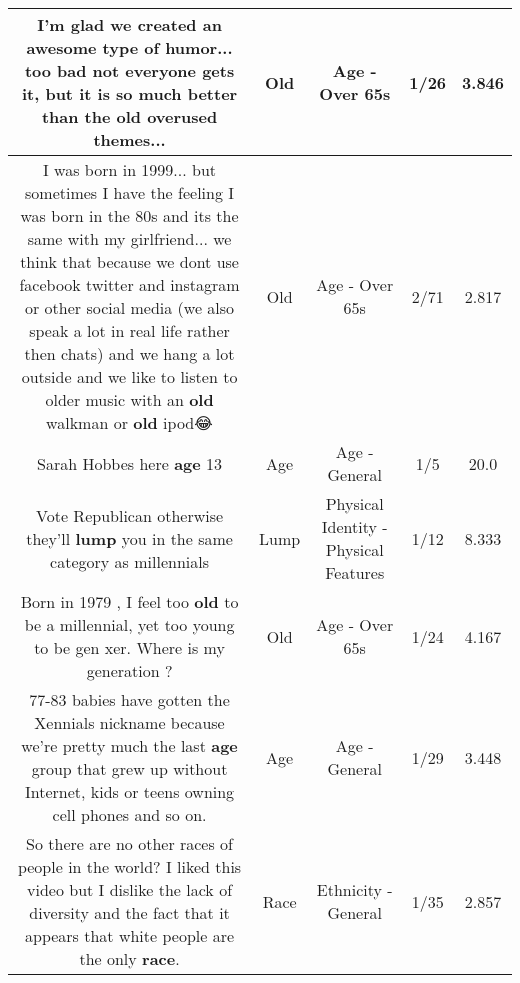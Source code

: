 \documentclass[11pt]{article}
\newlength\mylength
\begin{document}
\begin{center}
\begin{longtable}{|C{.65\mylength}|C{.30\mylength}|C{.12\mylength}|C{.12\mylength}|C{.12\mylength}|}
  \small I'm glad we created an awesome type of humor... too bad not everyone gets it, but it is so much better than the \textbf{old} overused themes...\normalsize   & Old & Age - Over 65s & 1/26 & 3.846 \\  \hline
  \small I was born in 1999... but sometimes I have the feeling I was born in the 80s and its the same with my girlfriend... we think that because we dont use  facebook twitter and instagram or other social media (we also speak a lot in real life rather then chats)  and we hang a lot outside and we like to listen to older music with an \textbf{old} walkman or \textbf{old} ipod😂\normalsize   & Old & Age - Over 65s & 2/71 & 2.817 \\  \hline
  \small Sarah Hobbes here \textbf{age} 13\normalsize   & Age & Age - General & 1/5 & 20.0 \\  \hline
  \small Vote Republican otherwise they'll \textbf{lump} you in the same category as millennials\normalsize   & Lump & Physical Identity - Physical Features & 1/12 & 8.333 \\  \hline
  \small Born in 1979 , I feel  too \textbf{old} to be a millennial,  yet  too young to be gen xer. Where is my generation  ?\normalsize   & Old & Age - Over 65s & 1/24 & 4.167 \\  \hline
  \small 77-83 babies have gotten the Xennials nickname because we're pretty much the last \textbf{age} group that grew up without Internet, kids or teens owning cell phones and so on.\normalsize   & Age & Age - General & 1/29 & 3.448 \\  \hline
  \small So there are no other races of people in the world? I liked this video but I dislike the lack of diversity and the fact that it appears that white people are the only \textbf{race}.\normalsize   & Race & Ethnicity - General & 1/35 & 2.857 \\  \hline

\end{longtable}
\end{center}
\end{document}

